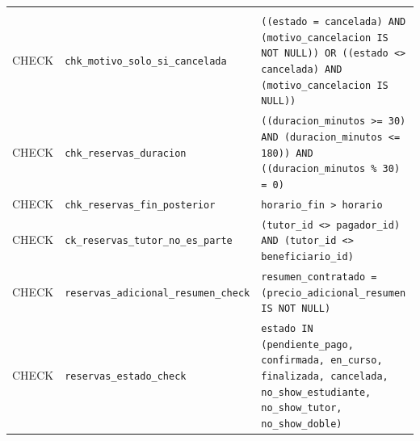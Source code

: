 {\small
\begin{xltabular}{\textwidth}{@{}>{\raggedright\arraybackslash}p{1.7cm} >{\raggedright\arraybackslash}p{4.6cm} L@{}}
    \toprule
     &  &  \\
    \midrule
    \endfirsthead
    \toprule
     &  &  \\
    \midrule
    \endhead
    \bottomrule
    \endfoot
    CHECK & \texttt{chk\_\allowbreak{}motivo\_\allowbreak{}solo\_\allowbreak{}si\_\allowbreak{}cancelada} & \texttt{(\allowbreak{}(\allowbreak{}estado = \textquotesingle{}cancelada\textquotesingle{}) AND (\allowbreak{}motivo\_\allowbreak{}cancelacion IS NOT NULL)) OR (\allowbreak{}(\allowbreak{}estado \textless{}\textgreater{} \textquotesingle{}cancelada\textquotesingle{}) AND (\allowbreak{}motivo\_\allowbreak{}cancelacion IS NULL))} \\
    CHECK & \texttt{chk\_\allowbreak{}reservas\_\allowbreak{}duracion} & \texttt{(\allowbreak{}(\allowbreak{}duracion\_\allowbreak{}minutos \textgreater{}= 30) AND (\allowbreak{}duracion\_\allowbreak{}minutos \textless{}= 180)) AND (\allowbreak{}(\allowbreak{}duracion\_\allowbreak{}minutos \% 30) = 0)} \\
    CHECK & \texttt{chk\_\allowbreak{}reservas\_\allowbreak{}fin\_\allowbreak{}posterior} & \texttt{horario\_\allowbreak{}fin \textgreater{} horario} \\
    CHECK & \texttt{ck\_\allowbreak{}reservas\_\allowbreak{}tutor\_\allowbreak{}no\_\allowbreak{}es\_\allowbreak{}parte} & \texttt{(\allowbreak{}tutor\_\allowbreak{}id \textless{}\textgreater{} pagador\_\allowbreak{}id) AND (\allowbreak{}tutor\_\allowbreak{}id \textless{}\textgreater{} beneficiario\_\allowbreak{}id)} \\
    CHECK & \texttt{reservas\_\allowbreak{}adicional\_\allowbreak{}resumen\_\allowbreak{}check} & \texttt{resumen\_\allowbreak{}contratado = (\allowbreak{}precio\_\allowbreak{}adicional\_\allowbreak{}resumen IS NOT NULL)} \\
    CHECK & \texttt{reservas\_\allowbreak{}estado\_\allowbreak{}check} & \texttt{estado IN (\allowbreak{}\textquotesingle{}pendiente\_\allowbreak{}pago\textquotesingle{},\allowbreak{} \textquotesingle{}confirmada\textquotesingle{},\allowbreak{} \textquotesingle{}en\_\allowbreak{}curso\textquotesingle{},\allowbreak{} \textquotesingle{}finalizada\textquotesingle{},\allowbreak{} \textquotesingle{}cancelada\textquotesingle{},\allowbreak{} \textquotesingle{}no\_\allowbreak{}show\_\allowbreak{}estudiante\textquotesingle{},\allowbreak{} \textquotesingle{}no\_\allowbreak{}show\_\allowbreak{}tutor\textquotesingle{},\allowbreak{} \textquotesingle{}no\_\allowbreak{}show\_\allowbreak{}doble\textquotesingle{})} \\

\end{xltabular}}
